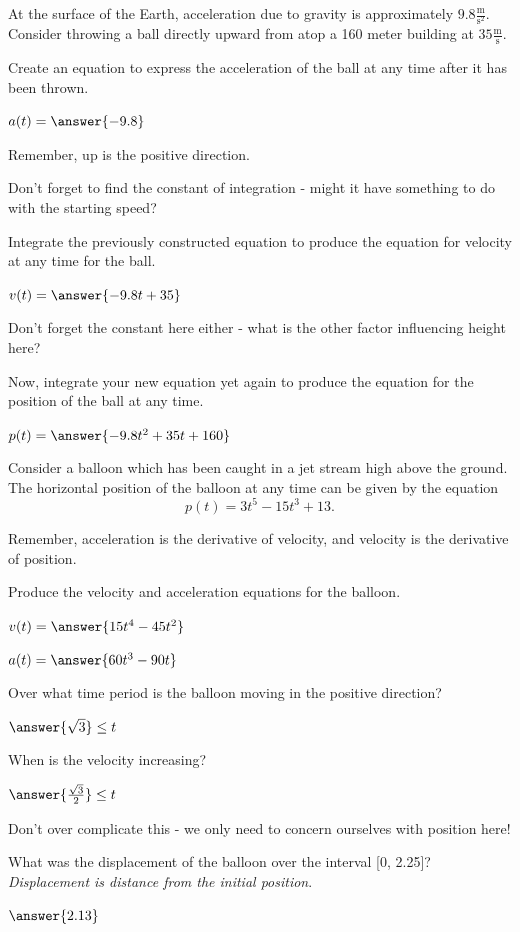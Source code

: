 \documentclass{ximera}
\begin{document}
\begin{question}
At the surface of the Earth, acceleration due to gravity is approximately $9.8 \frac{\text{m}}{\text{s}^2}$. Consider throwing a ball directly upward from atop a 160 meter building at $35 \frac{\text{m}}{\text{s}}$.

Create an equation to express the acceleration of the ball at any time after it has been thrown.

$a(t) = \answer{-9.8}$
\begin{feedback}
Remember, up is the positive direction.
\end{feedback}

\begin{hint}
Don't forget to find the constant of integration - might it have something to do with the starting speed?
\end{hint}
Integrate the previously constructed equation to produce the equation for velocity at any time for the ball.

$v(t) = \answer{-9.8t+35}$

\begin{hint}
Don't forget the constant here either - what is the other factor influencing height here?
\end{hint}
Now, integrate your new equation yet again to produce the equation for the position of the ball at any time.

$p(t) = \answer{-9.8t^2+35t+160}$
\end{question}
\begin{question}
Consider a balloon which has been caught in a jet stream high above the ground. The horizontal position of the balloon at any time can be given by the equation $$p(t) = 3t^5-15t^3+13\text{.}$$

\begin{hint}
Remember, acceleration is the derivative of velocity, and velocity is the derivative of position.
\end{hint}
Produce the velocity and acceleration equations for the balloon.

$v(t) = \answer{15t^4-45t^2}$

$a(t) = \answer{60t^3-90t}$

Over what time period is the balloon moving in the positive direction?

$\answer{\sqrt{3}} \leq t$

When is the velocity increasing?

$\answer{\frac{\sqrt{3}}{2}} \leq t$

\begin{hint}
Don't over complicate this - we only need to concern ourselves with position here!
\end{hint}
What was the displacement of the balloon over the interval [0, 2.25]? \textit{Displacement is distance from the initial position}.

$\answer{2.13}$
\end{question}
\end{document}
